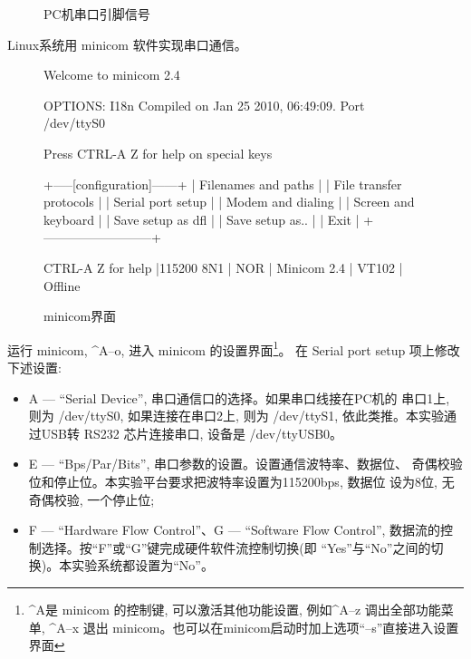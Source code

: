 \begin{figure}
\caption{PC机串口引脚信号}\label{pc-serial}
\end{figure}

Linux系统用 minicom 软件实现串口通信。

\begin{figure}[h]
\centering %
\begin{blockcode}
Welcome to minicom 2.4

OPTIONS: I18n
Compiled on Jan 25 2010, 06:49:09.
Port /dev/ttyS0

Press CTRL-A Z for help on special keys

            +-----[configuration]------+
            | Filenames and paths      |
            | File transfer protocols  |
            | Serial port setup        |
            | Modem and dialing        |
            | Screen and keyboard      |
            | Save setup as dfl        |
            | Save setup as..          |
            | Exit                     |
            +--------------------------+




CTRL-A Z for help |115200 8N1 | NOR | Minicom 2.4 | VT102 | Offline
\end{blockcode}
\caption{minicom界面}
\end{figure}

运行 minicom,  \^{}A--o, 进入 minicom 的设置界面\footnote{\^{}A是
minicom 的控制键, 可以激活其他功能设置, 例如\^{}A--z 调出全部功能菜单,
\^{}A--x 退出 minicom。也可以在minicom启动时加上选项``--s''直接进入设置界面}。
在 Serial port setup 项上修改下述设置:
\begin{itemize}
    \item A --- ``Serial Device'', 串口通信口的选择。如果串口线接在PC机的
        串口1上, 则为 /dev/ttyS0, 如果连接在串口2上, 则为 /dev/ttyS1,
        依此类推。本实验通过USB转 RS232 芯片连接串口, 设备是 /dev/ttyUSB0。
    \item E --- ``Bps/Par/Bits'', 串口参数的设置。设置通信波特率、数据位、
        奇偶校验位和停止位。本实验平台要求把波特率设置为115200bps, 数据位
        设为8位, 无奇偶校验, 一个停止位;
    \item F --- ``Hardware Flow Control''、G --- ``Software Flow Control'',
        数据流的控制选择。按``F''或``G''键完成硬件软件流控制切换(即
        ``Yes''与``No''之间的切换)。本实验系统都设置为``No''。
\end{itemize}

